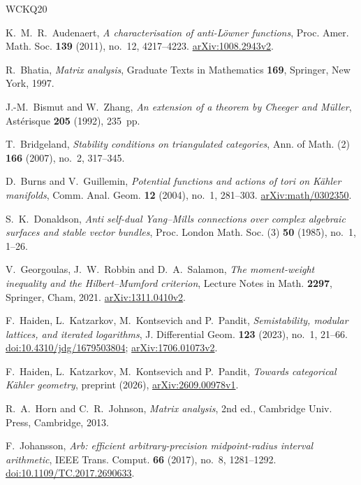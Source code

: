 \begin{thebibliography}{WCKQ20}

K.~M.~R.~Audenaert,
\textit{A characterisation of anti-L\"owner functions},
Proc. Amer. Math. Soc. \textbf{139} (2011), no.~12, 4217--4223.
\href{https://arxiv.org/abs/1008.2943v2}{arXiv:1008.2943v2}.

R.~Bhatia,
\textit{Matrix analysis},
Graduate Texts in Mathematics \textbf{169}, Springer, New York, 1997.

J.-M.~Bismut and W.~Zhang,
\textit{An extension of a theorem by Cheeger and M\"uller},
Ast\'erisque \textbf{205} (1992), 235~pp.

T.~Bridgeland,
\textit{Stability conditions on triangulated categories},
Ann. of Math. (2) \textbf{166} (2007), no.~2, 317--345.

D.~Burns and V.~Guillemin,
\textit{Potential functions and actions of tori on K\"ahler manifolds},
Comm. Anal. Geom. \textbf{12} (2004), no.~1, 281--303.
\href{https://arxiv.org/abs/math/0302350}{arXiv:math/0302350}.

S.~K.~Donaldson,
\textit{Anti self-dual Yang--Mills connections over complex algebraic
surfaces and stable vector bundles},
Proc. London Math. Soc. (3) \textbf{50} (1985), no.~1, 1--26.

V.~Georgoulas, J.~W.~Robbin and D.~A.~Salamon,
\textit{The moment-weight inequality and the Hilbert--Mumford criterion},
Lecture Notes in Math. \textbf{2297}, Springer, Cham, 2021.
\href{https://arxiv.org/abs/1311.0410v2}{arXiv:1311.0410v2}.

F.~Haiden, L.~Katzarkov, M.~Kontsevich and P.~Pandit,
\textit{Semistability, modular lattices, and iterated logarithms},
J. Differential Geom. \textbf{123} (2023), no.~1, 21--66.
\href{https://doi.org/10.4310/jdg/1679503804}{doi:10.4310/jdg/1679503804};
\href{https://arxiv.org/abs/1706.01073v2}{arXiv:1706.01073v2}.

F.~Haiden, L.~Katzarkov, M.~Kontsevich and P.~Pandit,
\textit{Towards categorical K\"ahler geometry},
preprint (2026), \href{https://arxiv.org/abs/2609.00978v1}{arXiv:2609.00978v1}.

R.~A.~Horn and C.~R.~Johnson,
\textit{Matrix analysis}, 2nd ed.,
Cambridge Univ. Press, Cambridge, 2013.

F.~Johansson,
\textit{Arb: efficient arbitrary-precision midpoint-radius interval
arithmetic},
IEEE Trans. Comput. \textbf{66} (2017), no.~8, 1281--1292.
\href{https://doi.org/10.1109/TC.2017.2690633}{doi:10.1109/TC.2017.2690633}.


\end{thebibliography}
